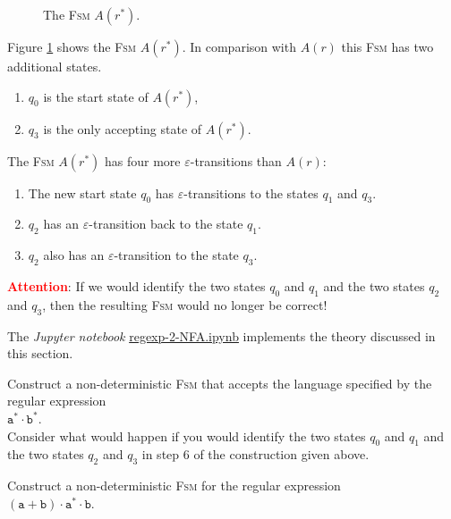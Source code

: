 \begin{enumerate}
      \begin{figure}[!ht]
        \centering
      \caption{The \textsc{Fsm} $A(r^*)$.}
      \label{fig:aStar.eps}
      \end{figure}
      Figure \ref{fig:aStar.eps} shows the \textsc{Fsm} $A(r^*)$.
      In comparison with $A(r)$ this \textsc{Fsm} has two additional states.
      \begin{enumerate}
      \item $q_0$ is the start state of $A(r^*)$,
      \item $q_3$ is the only accepting state of $A(r^*)$.
      \end{enumerate}
      The \textsc{Fsm} $A(r^*)$ has four more $\varepsilon$-transitions than $A(r)$: 
      \begin{enumerate}
      \item The new start state  $q_0$ has $\varepsilon$-transitions to the states
            $q_1$ and $q_3$.
      \item $q_2$ has an $\varepsilon$-transition back to the state $q_1$.
      \item $q_2$ also has an $\varepsilon$-transition to the state $q_3$.
      \end{enumerate}
      \textbf{\textcolor{red}{Attention}}:  If we would identify the two states 
      $q_0$ and $q_1$ and the two states $q_2$ and $q_3$, then the resulting \textsc{Fsm} would no longer be
      correct!
\end{enumerate}

The \textsl{Jupyter notebook}
\href{https://github.com/karlstroetmann/Formal-Languages/blob/master/Python/Regexp-2-NFA.ipynb}{regexp-2-NFA.ipynb} 
implements the theory discussed in this section.

\exerciseEng
Construct a non-deterministic \textsc{Fsm} that accepts the language specified by the regular expression
\\[0.2cm]
\hspace*{1.3cm}
$\texttt{a}^* \cdot \texttt{b}^*$.
\\[0.2cm]
Consider what would happen if you would identify the two states 
$q_0$ and $q_1$ and the two states $q_2$ and $q_3$ in step 6 of the construction given above. 
\eox

\exerciseEng
Construct a non-deterministic \textsc{Fsm} for the regular expression
\\[0.2cm]
\hspace*{1.3cm}
$(\texttt{a} + \texttt{b}) \cdot \texttt{a}^* \cdot \texttt{b}$.  
\eox



